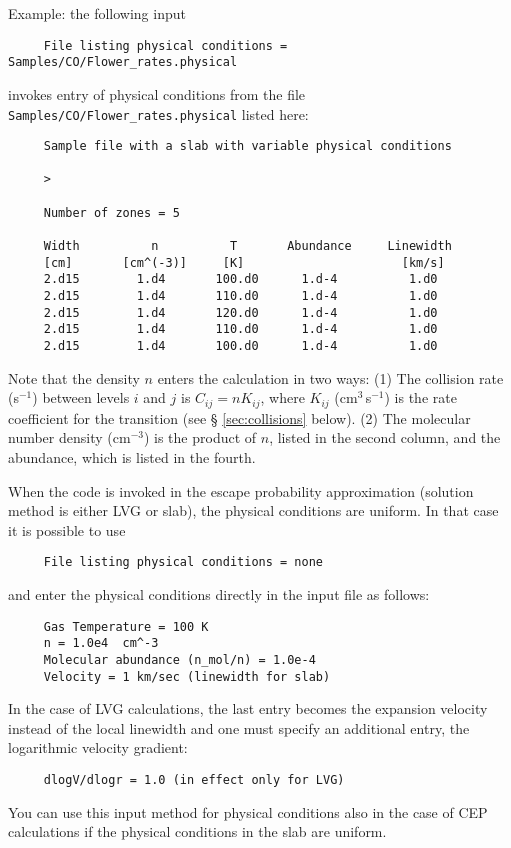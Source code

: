 \documentclass[12pt]{article}
\def\separation {0.5cm}
\begin{document}
Example: the following input
%
\smallskip
\begin{verbatim}
     File listing physical conditions = Samples/CO/Flower_rates.physical
\end{verbatim}
invokes entry of physical conditions from the file
\texttt{Samples/CO/Flower\_rates.physical} listed here:
\begin{verbatim}
     Sample file with a slab with variable physical conditions

     >

     Number of zones = 5

     Width          n          T       Abundance     Linewidth
     [cm]       [cm^(-3)]     [K]                      [km/s]
     2.d15        1.d4       100.d0      1.d-4          1.d0
     2.d15        1.d4       110.d0      1.d-4          1.d0
     2.d15        1.d4       120.d0      1.d-4          1.d0
     2.d15        1.d4       110.d0      1.d-4          1.d0
     2.d15        1.d4       100.d0      1.d-4          1.d0
\end{verbatim}
Note that the density $n$ enters the calculation in two ways: (1) The collision
rate (s$^{-1}$) between levels $i$ and $j$ is $C_{ij} = nK_{ij}$, where
$K_{ij}$ (cm$^3$\,s$^{-1}$) is the rate coefficient for the transition (see \S
\ref{sec:collisions} below). (2) The molecular number density (cm$^{-3}$) is
the product of $n$, listed in the second column, and the abundance, which is
listed in the fourth.


When the code is invoked in the escape probability approximation (solution
method is either LVG or slab), the physical conditions are uniform. In that
case it is possible to use
%
\smallskip
\begin{verbatim}
     File listing physical conditions = none
\end{verbatim}
and enter the physical conditions directly in the input file as follows:
\vspace{\separation}
\begin{verbatim}
     Gas Temperature = 100 K
     n = 1.0e4  cm^-3
     Molecular abundance (n_mol/n) = 1.0e-4
     Velocity = 1 km/sec (linewidth for slab)
\end{verbatim}
In the case of LVG calculations, the last entry becomes the expansion velocity
instead of the local linewidth and one must specify an additional entry, the
logarithmic velocity gradient:
%
\smallskip
\begin{verbatim}
     dlogV/dlogr = 1.0 (in effect only for LVG)
\end{verbatim}
You can use this input method for physical conditions also in the case of CEP
calculations if the physical conditions in the slab are uniform.
\end{document}

